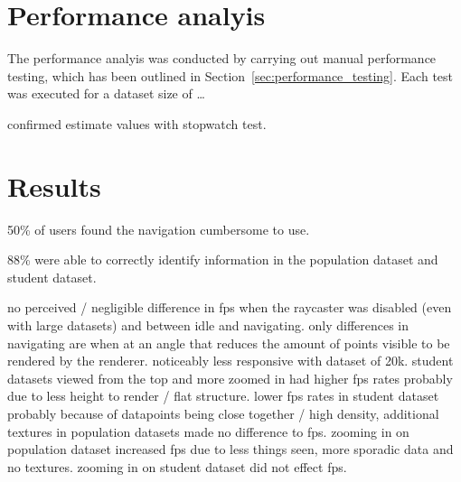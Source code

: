 \section{Performance analyis} {
\label{sec:performance_analysis}


	The performance analyis was conducted by carrying out manual performance testing, which has been outlined in Section~\ref{sec:performance_testing}. Each test was executed for a dataset size of \dots


	confirmed estimate values with stopwatch test.

}

\section{Results} {

	50\% of users found the navigation cumbersome to use.

	88\% were able to correctly identify information in the population dataset and student dataset.

	no perceived / negligible difference in fps when the raycaster was disabled (even with large datasets) and between idle and navigating. only differences in navigating are when at an angle that reduces the amount of points visible to be rendered by the renderer. noticeably less responsive with dataset of 20k. student datasets viewed from the top and more zoomed in had higher fps rates probably due to less height to render / flat structure. lower fps rates in student dataset probably because of datapoints being close together / high density, additional textures in population datasets made no difference to fps. zooming in on population dataset increased fps due to less things seen, more sporadic data and no textures. zooming in on student dataset did not effect fps.

}
